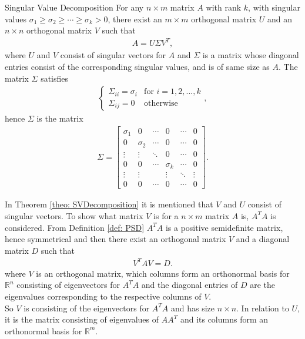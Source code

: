 \begin{theorem}{Singular Value Decomposition}
    For any $n \times m$ matrix $A$ with rank $k$, with singular values $\sigma_1 \geq \sigma_2 \geq \cdots \geq \sigma_k > 0$, there exist an $m\times m$ orthogonal matrix $U$ and an $n\times n$ orthogonal matrix $V$ such that 
    \begin{align*}
        A=U\Sigma V^T,
    \end{align*}
    where $U$ and $V$ consist of singular vectors for $A$ and $\Sigma$ is a matrix whose diagonal entries consist of the corresponding singular values, and is of same size as $A$. The matrix $\Sigma$ satisfies 
    \begin{align*}
            \begin{cases}
          \Sigma_{ii} = \sigma_i & \text{for } i =1, 2,...,k\\
          \Sigma_{ij}=0 & \text{otherwise}
    \end{cases},
    \end{align*}
    hence $\Sigma$ is the matrix 
    \begin{align*}
    \Sigma=
        \begin{bmatrix}
           \sigma_1 & 0 & \cdots & 0 & \cdots & 0\\
           0 & \sigma_2 & \cdots & 0 & \cdots & 0\\
           \vdots & \vdots & \ddots & 0 & \cdots & 0\\
           0 & 0 & \cdots & \sigma_k & \cdots & 0\\
           \vdots & \vdots & & \vdots & \ddots & \vdots\\
           0 & 0 & \cdots & 0 & \cdots & 0
        \end{bmatrix}.
    \end{align*}
    \label{theo: SVDecomposition}
    \cite[444-445]{LiAl}
\end{theorem}
    \noindent In Theorem \ref{theo: SVDecomposition} it is mentioned that $V$ and $U$ consist of singular vectors. To show what matrix $V$ is for a $n \times m$ matrix $A$ is, $A^TA$ is considered. From Definition \ref{def: PSD} $A^TA$ is a positive semidefinite matrix, hence symmetrical and then there exist an orthogonal matrix $V$ and a diagonal matrix $D$ such that 
    \begin{align*}
        V^TAV = D.    
    \end{align*}
    where $V$ is an orthogonal matrix, which columns form an orthonormal basis for $\mathbb{R}^n$ consisting of eigenvectors for $A^TA$ and the diagonal entries of $D$ are the eigenvalues corresponding to the respective columns of $V$\cite[426]{LiAl}.\\ 
    So $V$ is consisting of the eigenvectors for $A^TA$ and has size $n \times n$. In relation to $U$, it is the matrix consisting of eigenvalues of $AA^T$ and its columns form an orthonormal basis for $\mathbb{R}^m$.

